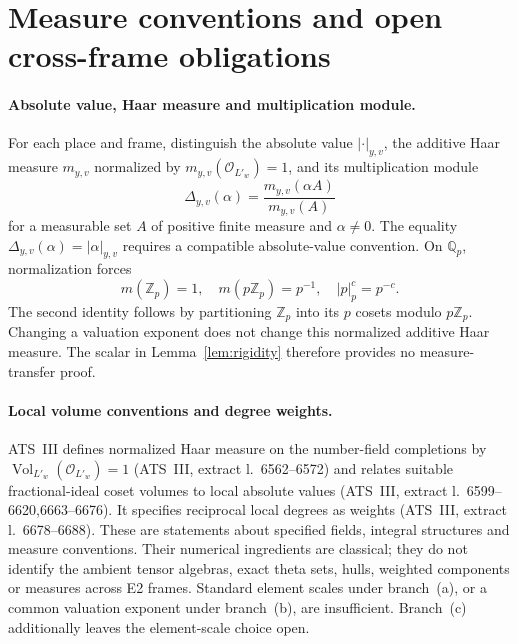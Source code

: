 \documentclass[11pt,a4paper]{article}
\theoremstyle{definition}
\theoremstyle{plain}
\theoremstyle{definition}
\newcommand{\Vol}{\operatorname{Vol}}
\newcommand{\anchor}[2]{(#1, extract l.~#2)}
\begin{document}
\section{Measure conventions and open cross-frame obligations}
\label{sec:measure}

\paragraph{Absolute value, Haar measure and multiplication module.}
For each place and frame, distinguish the absolute value $|\cdot|_{y,v}$,
the additive Haar measure $m_{y,v}$ normalized by
$m_{y,v}(\mathcal O_{L'_w})=1$, and its multiplication module
\[
 \Delta_{y,v}(\alpha)=\frac{m_{y,v}(\alpha A)}{m_{y,v}(A)}
\]
for a measurable set $A$ of positive finite measure and $\alpha\ne0$.
The equality $\Delta_{y,v}(\alpha)=|\alpha|_{y,v}$ requires a compatible
absolute-value convention. On $\mathbb Q_p$, normalization forces
\[
 m(\mathbb Z_p)=1,\quad m(p\mathbb Z_p)=p^{-1},\quad |p|_p^c=p^{-c}.
\]
The second identity follows by partitioning $\mathbb Z_p$ into its $p$
cosets modulo $p\mathbb Z_p$. Changing a valuation exponent does not change
this normalized additive Haar measure. The scalar in
Lemma~\ref{lem:rigidity} therefore provides no measure-transfer proof.

\paragraph{Local volume conventions and degree weights.}
ATS~III defines normalized Haar measure on the number-field completions
by $\Vol_{L'_w}(\mathcal O_{L'_w})=1$
\anchor{ATS~III}{6562--6572} and relates suitable fractional-ideal coset
volumes to local absolute values
\anchor{ATS~III}{6599--6620,6663--6676}.
It specifies reciprocal local degrees as weights
\anchor{ATS~III}{6678--6688}.
These are statements about specified fields, integral structures and
measure conventions. Their numerical ingredients are classical; they do not
identify the ambient tensor algebras, exact theta sets, hulls, weighted
components or measures across E2 frames. Standard element scales under
branch~(a), or a common valuation exponent under branch~(b), are insufficient.
Branch~(c) additionally leaves the element-scale choice open.
\end{document}
